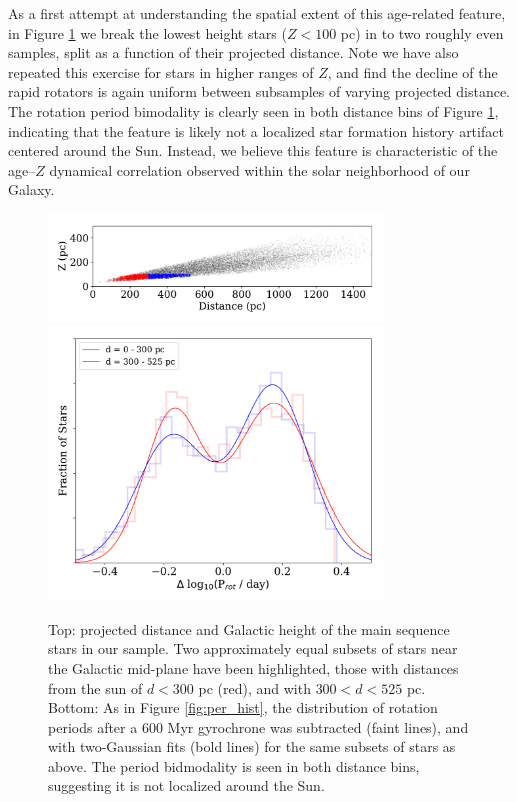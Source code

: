 \documentclass[preprint2]{aastex62}
\begin{document}
As a first attempt at understanding the spatial extent of this age-related feature, in Figure \ref{fig:dZ} we break the lowest height stars ($Z < 100$ pc) in to two roughly even samples, split as a function of their projected distance. Note we have also repeated this exercise for stars in higher ranges of $Z$, and find the decline of the rapid rotators is again uniform between subsamples of varying projected distance. The rotation period bimodality is clearly seen in both distance bins of Figure \ref{fig:dZ}, indicating that the feature is likely not a localized star formation history artifact centered around the Sun. Instead, we believe this feature is characteristic of the age--$Z$ dynamical correlation observed within the solar neighborhood of our Galaxy. 

\begin{figure}[!ht]
\centering
\includegraphics[width=3.5in]{../figures/dist_Z}
\includegraphics[width=3.5in]{../figures/delta_per_subZ}
\caption{
Top: projected distance and Galactic height of the main sequence stars in our sample. Two approximately equal subsets of stars near the Galactic mid-plane have been highlighted, those with distances from the sun of $d<300$ pc (red), and with $300<d<525$ pc.
Bottom: As in Figure \ref{fig:per_hist}, the distribution of rotation periods after a 600 Myr gyrochrone was subtracted (faint lines), and with two-Gaussian fits (bold lines) for the same subsets of stars as above. The period bidmodality is seen in both distance bins, suggesting it is not localized around the Sun.
}
\label{fig:dZ}
\end{figure}
\end{document}
